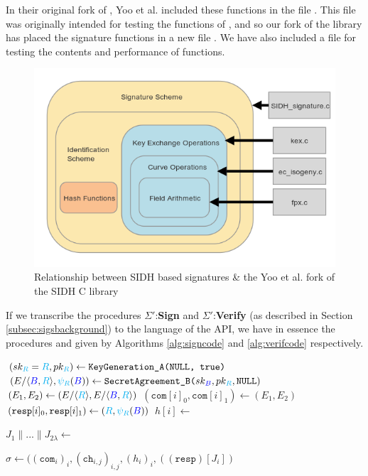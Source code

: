 In their original fork of \sidh, Yoo et al. included these functions in the file . This file was originally intended for testing the functions of , and so our fork of the library has placed the signature functions in a new file . We have also included a file  for testing the contents and performance of  functions. 

\begin{figure}[htp]
\centering
\includegraphics[scale=0.7]{fullmapwcurve.png} %
\caption{Relationship between SIDH based signatures \& the Yoo et al. fork of the SIDH C library}
\label{fig:fullmap} %
\end{figure}

If we transcribe the procedures $\Sigma'$:\textbf{Sign} and $\Sigma'$:\textbf{Verify} (as described in Section \ref{subsec:sigsbackground}) to the language of the \sidh API, we have in essence the procedures  and  given by Algorithms \ref{alg:signcode} and \ref{alg:verifcode} respectively.\\

\begin{algorithm}
\caption{-- }\label{alg:signcode}
\begin{algorithmic}[1]
	\State $(sk_{\textcolor{cyan}{R}} = \textcolor{cyan}{R}, pk_{\textcolor{cyan}{R}}) \gets \texttt{KeyGeneration\_A(\texttt{NULL}, \texttt{true})}$
	\State $(E/\langle \textcolor{blue}{B},\textcolor{cyan}{R} \rangle, \textcolor{cyan}{\psi_R}(\textcolor{blue}{B})) \gets \texttt{SecretAgreement\_B(}sk_{\textcolor{blue}{B}}, pk_{\textcolor{cyan}{R}}, \texttt{NULL})$
	\State $(E_{1},E_{2}) \gets (E/\langle \textcolor{cyan}{R} \rangle, E/\langle \textcolor{blue}{B},\textcolor{cyan}{R} \rangle)$
	\State $(\texttt{com}[i]_{0}, \texttt{com}[i]_{1}) \gets (E_{1}, E_{2})$
	\State $(\texttt{resp}[i]_{0}, \texttt{resp}[i]_{1}) \gets (\textcolor{cyan}{R}, \textcolor{cyan}{\psi_R}(\textcolor{blue}{B}))$
	\State $h[i] \gets$ 
\EndFor

\State $J_{1} \parallel ... \parallel J_{2\lambda} \gets$ 

\State \Return $\sigma \gets ((\texttt{com}_{i})_{i}, (\texttt{ch}_{i,j})_{i,j}, (h_{i})_{i}, ((\texttt{resp})[J_{i}])$
\end{algorithmic}
\end{algorithm}

